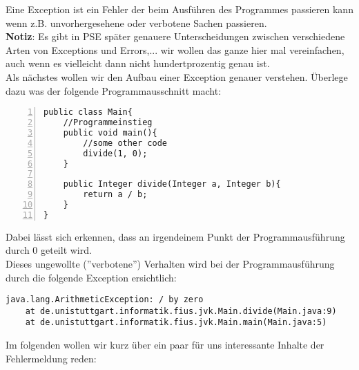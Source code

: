 \begin{Infobox}[Exception]
    Eine Exception ist ein Fehler der beim Ausführen des Programmes passieren kann wenn z.B. unvorhergesehene oder verbotene Sachen passieren.\\


    \textbf{Notiz}: Es gibt in PSE später genauere Unterscheidungen zwischen verschiedene Arten von Exceptions und Errors,... wir wollen das ganze hier mal vereinfachen, auch wenn es vielleicht dann nicht hundertprozentig genau ist.\\

    Als nächstes wollen wir den Aufbau einer Exception genauer verstehen.
    Überlege dazu was der folgende Programmausschnitt macht:

    \begin{lstlisting}[numbers=left,xleftmargin=2em,frame=single,framexleftmargin=1.5em]
public class Main{
    //Programmeinstieg
    public void main(){
        //some other code
        divide(1, 0);
    }
    
    public Integer divide(Integer a, Integer b){
        return a / b;
    }
}
    \end{lstlisting}

    Dabei lässt sich erkennen, dass an irgendeinem Punkt der Programmausführung durch 0 geteilt wird.\\
    Dieses ungewollte (''verbotene'') Verhalten wird bei der Programmausführung durch die folgende Exception ersichtlich:

    \begin{lstlisting}[keywords={}, breaklines=true, numbers=none]
java.lang.ArithmeticException: / by zero
    at de.unistuttgart.informatik.fius.jvk.Main.divide(Main.java:9)
    at de.unistuttgart.informatik.fius.jvk.Main.main(Main.java:5)
    \end{lstlisting}    

    Im folgenden wollen wir kurz über ein paar für uns interessante Inhalte der Fehlermeldung reden:


\end{Infobox}
